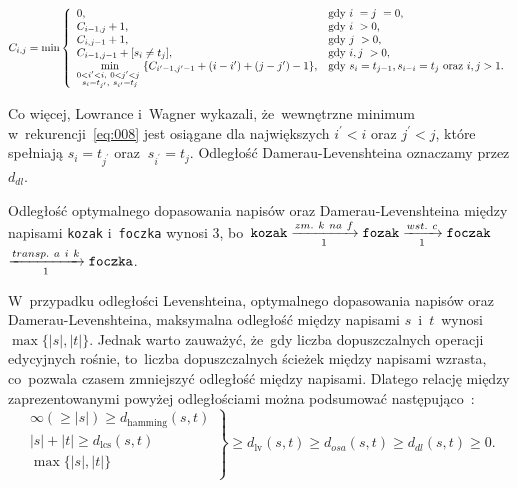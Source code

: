 \documentclass{praca1}
\begin{document}
\begin{equation}
\label{eq:008}
C_{i,j} = \min\left\{
\begin{array}{l l}     
    0, & \text{gdy } i~= j~= 0,\\
    C_{i-1, j} + 1, & \text{gdy } i~> 0, \\
    C_{i, j-1} + 1, & \text{gdy } j~> 0, \\
    C_{i-1, j-1} + [s_{i}\neq t_{j}], & \text{gdy } i, j~> 0, \\
    \min\limits_{\substack{0 < i^{\prime} < i,\ 0 < j^{\prime} < j~ \\ s_i = t_{j^{\prime}},\ s_{i^{\prime}} = t_j}} \{C_{i^{\prime}-1, j^{\prime}-1} + (i-i^{\prime}) + (j-j^{\prime}) - 1\} , & \text{gdy } s_i = t_{j-1}, s_{i-i} = t_j \text{ oraz } i,j > 1.
\end{array}\right.
\end{equation}

Co więcej, Lowrance i~Wagner wykazali, że~wewnętrzne minimum w~rekurencji~\eqref{eq:008} jest osiągane dla największych $i^{\prime} < i$ oraz $j^{\prime} < j$, które spełniają $s_i = t_{j^{\prime}}$ oraz $\ s_{i^{\prime}} = t_j$. Odległość Damerau-Levenshteina oznaczamy przez $d_{dl}$.

\begin{example}
Odległość optymalnego dopasowania napisów oraz Damerau-Levenshteina między napisami \verb|kozak| i~\verb|foczka| wynosi $3$, bo~$\verb|kozak| \xrightarrow[1]{zm.\ k\ na\ f} \verb|fozak|  \xrightarrow[1]{wst.\ c} \verb|foczak|$ $\xrightarrow[1]{transp.\ a\ i\ k} \verb|foczka|$.
\end{example}

W~przypadku odległości Levenshteina, optymalnego dopasowania napisów oraz Damerau-Levenshteina, maksymalna odległość między napisami $s$~i~$t$~wynosi $\max\{|s|, |t|\}$. Jednak warto zauważyć, że~gdy liczba dopuszczalnych operacji edycyjnych rośnie, to~liczba dopuszczalnych ścieżek między napisami wzrasta, co~pozwala czasem zmniejszyć odległość między napisami. Dlatego relację między zaprezentowanymi powyżej odległościami można podsumować następująco~\cite{Loo2014:stringdist}:
$$
\left. \begin{array}{r}
\infty (\geq |s|) \geq d_{\mathrm{hamming}}(s,t) \\
|s| + |t| \geq d_{\mathrm{lcs}}(s,t) \\
\max\{|s|, |t|\} \\
\end{array} \right \}
\geq d_{\mathrm{lv}}(s,t) \geq d_{osa}(s,t) \geq d_{dl}(s,t) \geq 0.
$$
\end{document}
